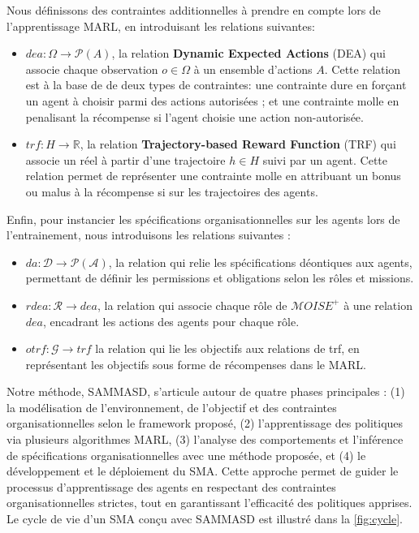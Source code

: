 \documentclass[sigconf,anonymous]{aamas}
\begin{document}
Nous définissons des contraintes additionnelles à prendre en compte lors de l'apprentissage MARL, en introduisant les relations suivantes:

\begin{itemize}
    \item $dea: \Omega \rightarrow \mathcal{P}(A)$, la relation \textbf{Dynamic Expected Actions} (DEA) qui associe chaque observation $o \in \Omega$ à un ensemble d'actions $A$. Cette relation est à la base de de deux types de contraintes: une contrainte dure en forçant un agent à choisir parmi des actions autorisées ; et une contrainte molle en penalisant la récompense si l'agent choisie une action non-autorisée.
    \item $trf: H \rightarrow \mathbb{R}$, la relation \textbf{Trajectory-based Reward Function} (TRF) qui associe un réel à partir d'une trajectoire $h \in H$ suivi par un agent. Cette relation permet de représenter une contrainte molle en attribuant un bonus ou malus à la récompense si  sur les trajectoires des agents.
\end{itemize}

Enfin, pour instancier les spécifications organisationnelles sur les agents lors de l'entrainement, nous introduisons les relations suivantes :
\begin{itemize}
    \item $da: \mathcal{D} \rightarrow \mathcal{P}(\mathcal{A})$, la relation qui relie les spécifications déontiques aux agents, permettant de définir les permissions et obligations selon les rôles et missions.
    \item $rdea: \mathcal{R} \rightarrow dea$, la relation qui associe chaque rôle de $\mathcal{M}OISE^+$ à une relation $dea$, encadrant les actions des agents pour chaque rôle.
    \item $otrf: \mathcal{G} \rightarrow trf$ la relation qui lie les objectifs aux relations de trf, en représentant les objectifs sous forme de récompenses dans le MARL.
\end{itemize}

Notre méthode, SAMMASD, s'articule autour de quatre phases principales : (1) la modélisation de l'environnement, de l'objectif et des contraintes organisationnelles selon le framework proposé, (2) l'apprentissage des politiques via plusieurs algorithmes MARL, (3) l'analyse des comportements et l'inférence de spécifications organisationnelles avec une méthode proposée, et (4) le développement et le déploiement du SMA. Cette approche permet de guider le processus d'apprentissage des agents en respectant des contraintes organisationnelles strictes, tout en garantissant l'efficacité des politiques apprises. Le cycle de vie d'un SMA conçu avec SAMMASD est illustré dans la \autoref{fig:cycle}.
\end{document}
